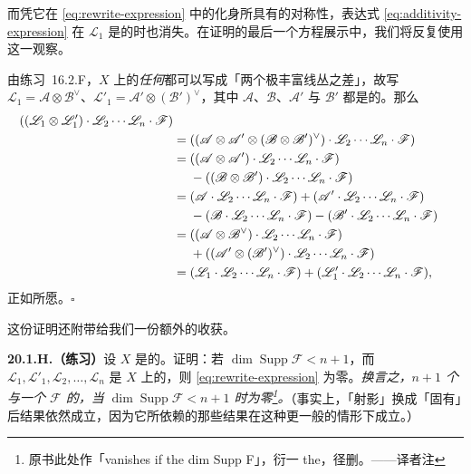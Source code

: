 而凭它在 \eqref{eq:rewrite-expression} 中的化身所具有的对称性，表达式 \eqref{eq:additivity-expression} 在 $\mathscr{L}_1$ 是\trVeryAmple{}的时也消失。在证明的最后一个方程展示中，我们将反复使用这一观察。

由\mbox{练习~16.2.F}，$X$ 上的\emph{任何}\trInvertibleSheaf{}都可以写成「两个极丰富线丛之差」，故写 $\mathscr{L}_1=\mathscr{A}\otimes\mathscr{B}^{\vee}$、$\mathscr{L}'_1=\mathscr{A}'\otimes(\mathscr{B}')^{\vee}$，其中 $\mathscr{A}$、$\mathscr{B}$、$\mathscr{A}'$ 与 $\mathscr{B}'$ 都是\trVeryAmple{}的。那么
\begin{align*}
((\mathscr{L}_1\otimes\mathscr{L}'_1)\cdot\mathscr{L}_2\cdots\mathscr{L}_n\cdot\mathscr{F})\\
&= ((\mathscr{A}\otimes\mathscr{A}'\otimes(\mathscr{B}\otimes\mathscr{B}')^{\vee})\cdot\mathscr{L}_2\cdots\mathscr{L}_n\cdot\mathscr{F})\\
&=((\mathscr{A}\otimes\mathscr{A}')\cdot\mathscr{L}_2\cdots\mathscr{L}_n\cdot\mathscr{F})\\
&\hphantom{{}={}}-((\mathscr{B}\otimes\mathscr{B}')\cdot\mathscr{L}_2\cdots\mathscr{L}_n\cdot\mathscr{F})\\
&=(\mathscr{A}\cdot\mathscr{L}_2\cdots\mathscr{L}_n\cdot\mathscr{F})+(\mathscr{A}'\cdot\mathscr{L}_2\cdots\mathscr{L}_n\cdot\mathscr{F})\\
&\hphantom{{}={}}-(\mathscr{B}\cdot\mathscr{L}_2\cdots\mathscr{L}_n\cdot\mathscr{F})-(\mathscr{B}'\cdot\mathscr{L}_2\cdots\mathscr{L}_n\cdot\mathscr{F})\\
&=((\mathscr{A}\otimes\mathscr{B}^{\vee})\cdot\mathscr{L}_2\cdots\mathscr{L}_n\cdot\mathscr{F})\\
&\hphantom{{}={}}+((\mathscr{A}'\otimes(\mathscr{B}')^{\vee})\cdot\mathscr{L}_2\cdots\mathscr{L}_n\cdot\mathscr{F})\\
&=(\mathscr{L}_1\cdot\mathscr{L}_2\cdots\mathscr{L}_n\cdot\mathscr{F})+(\mathscr{L}'_1\cdot\mathscr{L}_2\cdots\mathscr{L}_n\cdot\mathscr{F}),
\end{align*}
正如所愿。\hfill$\square$

这份证明还附带给我们一份额外的收获。

\textbf{20.1.H.（练习）}\quad 设 $X$ 是\trProjective{}的。证明：若 $\dim\operatorname{Supp}\mathscr{F}<n+1$，而 $\mathscr{L}_1,\mathscr{L}'_1,\mathscr{L}_2,\dots,\mathscr{L}_n$ 是 $X$ 上的\trInvertibleSheaf，则 \eqref{eq:rewrite-expression} 为零。\emph{换言之，$n+1$ 个\trInvertibleSheaf{}与一个\trCoherentSheaf{} $\mathscr{F}$ 的\trIntersectionProduct，当 $\dim\operatorname{Supp}\mathscr{F}<n+1$ 时为零\footnote{原书此处作「vanishes if the dim Supp F」，衍一 the，径删。——译者注}。}（事实上，「射影」换成「固有」后结果依然成立，因为它所依赖的那些结果在这种更一般的情形下成立。）

